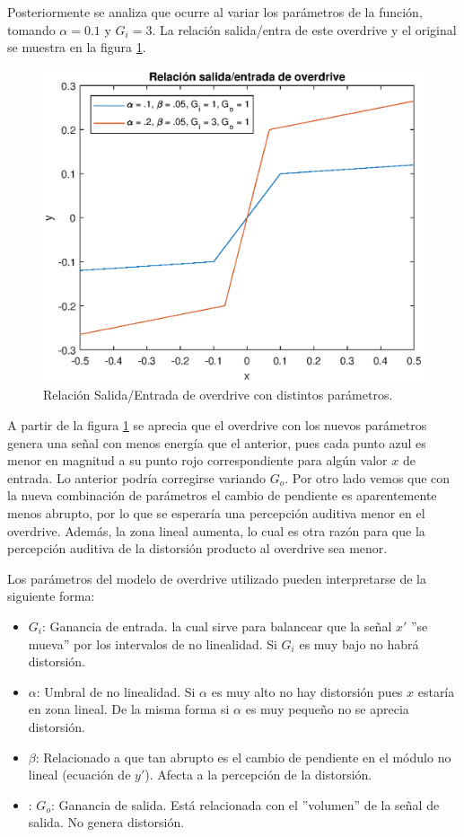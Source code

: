 Posteriormente se analiza que ocurre al variar los parámetros de la función, tomando $\alpha=0.1$ y $G_i = 3$. La relación salida/entra de este overdrive y el original se muestra en la figura \ref{fig:p212}.

\begin{figure}[H]
    \centering
    \includegraphics[width = .8\linewidth]{Figuras/p212_relacion-overdrive.eps}
    \caption{Relación Salida/Entrada de overdrive con distintos parámetros.}
    \label{fig:p212}
\end{figure}

A partir de la figura \ref{fig:p212} se aprecia que el overdrive con los nuevos parámetros genera una señal con menos energía que el anterior, pues cada punto azul es menor en magnitud a su punto rojo correspondiente para algún valor $x$ de entrada. Lo anterior podría corregirse variando $G_o$. Por otro lado vemos que con la nueva combinación de parámetros el cambio de pendiente es aparentemente menos abrupto, por lo que se esperaría una percepción auditiva menor en el overdrive. Además, la zona lineal aumenta, lo cual es otra razón para que la percepción auditiva de la distorsión producto al overdrive sea menor.

Los parámetros del modelo de overdrive utilizado pueden interpretarse de la siguiente forma:
\begin{itemize}
    \item $G_i$: Ganancia de entrada. la cual sirve para balancear que la señal $x'$ ''se mueva'' por los intervalos de no linealidad. Si $G_i$ es muy bajo no habrá distorsión. 
    \item $\alpha$: Umbral de no linealidad. Si $\alpha$ es muy alto no hay distorsión pues $x$ estaría en zona lineal. De la misma forma si $\alpha$ es muy pequeño no se aprecia distorsión.
    \item $\beta$: Relacionado a que tan abrupto es el cambio de pendiente en el módulo no lineal (ecuación de $y'$). Afecta a la percepción de la distorsión. 
    \item: $G_o$: Ganancia de salida. Está relacionada con el ''volumen'' de la señal de salida. No genera distorsión.
\end{itemize}

